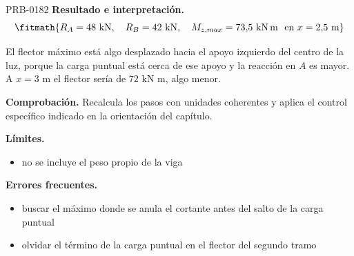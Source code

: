 \begin{studiumworked}{PRB-0182}
\textbf{Resultado e interpretación.}\[\fitmath{R_A = 48\ \mathrm{kN},\quad R_B = 42\ \mathrm{kN},\quad M_{z,max} = 73{,}5\ \mathrm{kN\,m}\ \text{ en }x = 2{,}5\ \mathrm{m}}\]

El flector máximo está algo desplazado hacia el apoyo izquierdo del centro de la luz, porque la carga puntual está cerca de ese apoyo y la reacción en $A$ es mayor. A $x = 3$ m el flector sería de $72$ kN m, algo menor.

\par\textbf{Comprobación.} Recalcula los pasos con unidades coherentes y aplica el control específico indicado en la orientación del capítulo.

\textbf{Límites.}\begin{itemize}\item no se incluye el peso propio de la viga\end{itemize}

\textbf{Errores frecuentes.}\begin{itemize}\item buscar el máximo donde se anula el cortante antes del salto de la carga puntual
\item olvidar el término de la carga puntual en el flector del segundo tramo\end{itemize}

\end{studiumworked}

\Needspace{.3\textheight}

